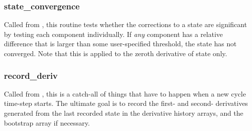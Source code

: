 \subsubsection{state\_convergence}\label{ref:GJ_state_convergence}

Called from ,
this routine tests whether the
corrections to a state are significant by testing each component
individually. If \textit{any} component has a relative difference
that is larger than some user-specified threshold, the state has not
converged. Note that this is applied to the zeroth derivative of
state only.

\subsubsection{record\_deriv}\label{ref:GJ_record_deriv}

Called from , 
this is a catch-all of things that
have to happen when a new cycle time-step starts. The ultimate goal
is to record the first- and second- derivatives generated from the last
recorded state in the derivative history arrays, and the bootstrap
array if necessary.

